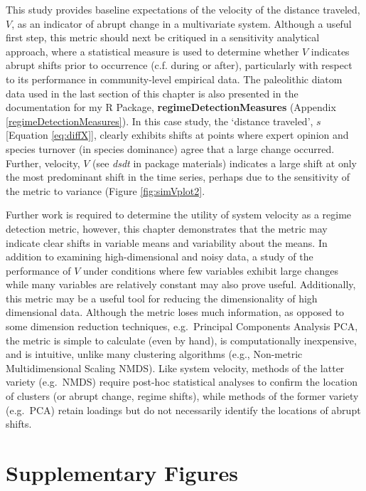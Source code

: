 \documentclass[12pt,twoside,openany]{reedthesis}
\begin{document}
This study provides baseline expectations of the velocity of the distance traveled, \(V\), as an indicator of abrupt change in a multivariate system. Although a useful first step, this metric should next be critiqued in a sensitivity analytical approach, where a statistical measure is used to determine whether \(V\) indicates abrupt shifts prior to occurrence (c.f. during or after), particularly with respect to its performance in community-level empirical data. The paleolithic diatom data used in the last section of this chapter is also presented in the documentation for my R Package, \textbf{regimeDetectionMeasures} (Appendix \ref{regimeDetectionMeasures}). In this case study, the `distance traveled', \(s\) {[}Equation \eqref{eq:diffX}{]}, clearly exhibits shifts at points where expert opinion and species turnover (in species dominance) agree that a large change occurred. Further, velocity, \(V\) (see \emph{dsdt} in package materials) indicates a large shift at only the most predominant shift in the time series, perhaps due to the sensitivity of the metric to variance (Figure \ref{fig:simVplot2}.

Further work is required to determine the utility of system velocity as a regime detection metric, however, this chapter demonstrates that the metric may indicate clear shifts in variable means and variability about the means. In addition to examining high-dimensional and noisy data, a study of the performance of \(V\) under conditions where few variables exhibit large changes while many variables are relatively constant may also prove useful. Additionally, this metric may be a useful tool for reducing the dimensionality of high dimensional data. Although the metric loses much information, as opposed to some dimension reduction techniques, e.g.~Principal Components Analysis PCA, the metric is simple to calculate (even by hand), is computationally inexpensive, and is intuitive, unlike many clustering algorithms (e.g., Non-metric Multidimensional Scaling NMDS). Like system velocity, methods of the latter variety (e.g.~NMDS) require post-hoc statistical analyses to confirm the location of clusters (or abrupt change, regime shifts), while methods of the former variety (e.g.~PCA) retain loadings but do not necessarily identify the locations of abrupt shifts.

\hypertarget{supplementary-figures}{%
\section{Supplementary Figures}\label{supplementary-figures}}
\end{document}

